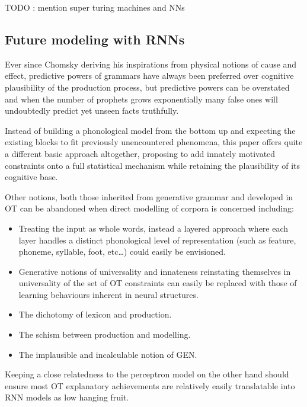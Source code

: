 \documentclass[a4paper,12pt]{article}
\begin{document}
TODO : mention super turing machines and NNs


\subsection{Future modeling with RNNs}

Ever since Chomsky deriving his inspirations from physical notions of cause and effect, predictive
powers of grammars have always been preferred over cognitive plausibility of the production
process, but predictive powers can be overstated and when the number of prophets grows
exponentially many false ones will undoubtedly predict yet unseen facts truthfully.

Instead of building a phonological model from the bottom up and expecting the existing blocks to
fit previously unencountered phenomena, this paper offers quite a different basic approach
altogether, proposing to add innately motivated constraints onto a full statistical mechanism while
retaining the plausibility of its cognitive base.

Other notions, both those inherited from generative grammar and developed in OT can be abandoned
when direct modelling of corpora is concerned including:
\begin{itemize}
  \item Treating the input as whole words, instead a layered approach where each layer handles a
  distinct phonological level of representation (such as feature, phoneme, syllable, foot, etc\ldots) could
  easily be envisioned.
  \item Generative notions of universality and innateness reinstating themselves in universality of
  the set of OT constraints can easily be replaced with those of learning behaviours inherent in
  neural structures.
  \item The dichotomy of lexicon and production.
  \item The schism between production and modelling.
  \item The implausible and incalculable notion of GEN.
\end{itemize}

Keeping a close relatedness to the perceptron model on the other hand should ensure most OT
explanatory achievements are relatively easily translatable into RNN models as low hanging fruit.

\fi

\pagebreak


\nocite{*}

\end{document}
